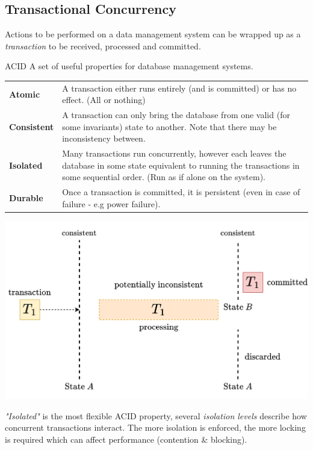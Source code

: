 \subsection{Transactional Concurrency}

Actions to be performed on a data management system can be wrapped up as a \textit{transaction} to be received, processed and committed.

\begin{definitionbox}{ACID}
    A set of useful properties for database management systems.
    \begin{center}
        \begin{tabular}{l p{}}
            \textbf{Atomic}     & A transaction either runs entirely (and is committed) or has no effect. (All or nothing)                                                                                             \\
            \textbf{Consistent} & A transaction can only bring the database from one valid (for some invariants) state to another. Note that there may be inconsistency between.                                       \\
            \textbf{Isolated}   & Many transactions run concurrently, however each leaves the database in some state equivalent to running the transactions in some sequential order. (Run as if alone on the system). \\
            \textbf{Durable}    & Once a transaction is committed, it is persistent (even in case of failure - e.g power failure).                                                                                     \\
        \end{tabular}
    \end{center}
\end{definitionbox}
\begin{center}
    \includegraphics[width=.7\textwidth]{introduction/images/consistent_state.drawio.png}
\end{center}
\noindent
\textit{"Isolated"} is the most flexible ACID property, several \textit{isolation levels} describe how concurrent transactions interact.
The more isolation is enforced, the more locking is required which can affect performance (contention \& blocking).

